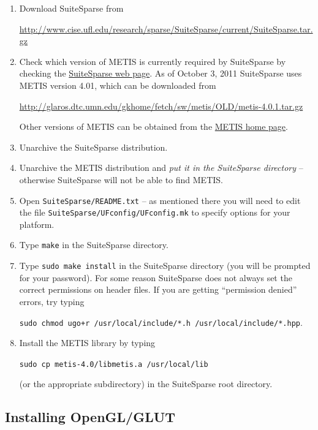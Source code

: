 \documentclass{article}
\begin{document}
\begin{enumerate}

\item Download SuiteSparse from

\url{http://www.cise.ufl.edu/research/sparse/SuiteSparse/current/SuiteSparse.tar.gz}

\item Check which version of METIS is currently required by SuiteSparse by checking the \href{http://www.cise.ufl.edu/research/sparse/SuiteSparse/}{SuiteSparse web page}.  As of October 3, 2011 SuiteSparse uses METIS version 4.01, which can be downloaded from

\url{http://glaros.dtc.umn.edu/gkhome/fetch/sw/metis/OLD/metis-4.0.1.tar.gz}

Other versions of METIS can be obtained from the \href{http://glaros.dtc.umn.edu/gkhome/metis/metis/download}{METIS home page}.

\item Unarchive the SuiteSparse distribution.

\item Unarchive the METIS distribution and \emph{put it in the SuiteSparse directory} -- otherwise SuiteSparse will not be able to find METIS.

\item Open \texttt{SuiteSparse/README.txt} -- as mentioned there you will need to edit the file \texttt{SuiteSparse/UFconfig/UFconfig.mk} to specify options for your platform.

\item Type \texttt{make} in the SuiteSparse directory.

\item Type \texttt{sudo make install} in the SuiteSparse directory (you will be prompted for your password).  For some reason SuiteSparse does not always set the correct permissions on header files.  If you are getting ``permission denied'' errors, try typing

\texttt{sudo chmod ugo+r /usr/local/include/*.h /usr/local/include/*.hpp}.

\item Install the METIS library by typing

\texttt{sudo cp metis-4.0/libmetis.a /usr/local/lib}

(or the appropriate subdirectory) in the SuiteSparse root directory.

\end{enumerate}


\subsection{Installing OpenGL/GLUT}
\end{document}
